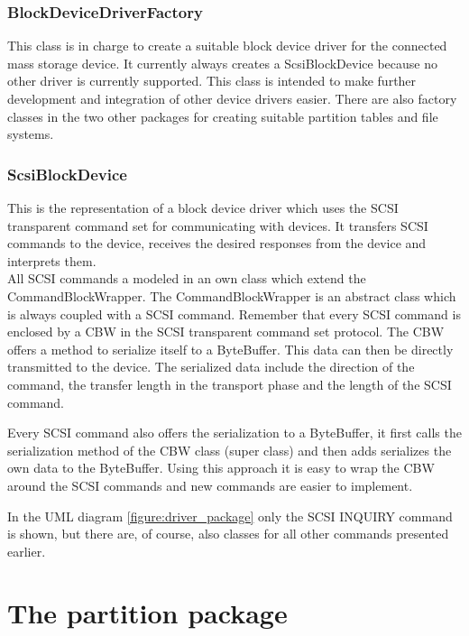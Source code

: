 \subsubsection{BlockDeviceDriverFactory}

This class is in charge to create a suitable block device driver for the connected mass storage device. It currently always creates a ScsiBlockDevice because no other driver is currently supported. This class is intended to make further development and integration of other device drivers easier. There are also factory classes in the two other packages for creating suitable partition tables and file systems.

\subsubsection{ScsiBlockDevice}

This is the representation of a block device driver which uses the SCSI transparent command set for communicating with devices. It transfers SCSI commands to the device, receives the desired responses from the device and interprets them.\\

All SCSI commands a modeled in an own class which extend the CommandBlockWrapper. The CommandBlockWrapper is an abstract class which is always coupled with a SCSI command. Remember that every SCSI command is enclosed by a CBW in the SCSI transparent command set protocol. The CBW offers a method to serialize itself to a ByteBuffer. This data can then be directly transmitted to the device. The serialized data include the direction of the command, the transfer length in the transport phase and the length of the SCSI command.

Every SCSI command also offers the serialization to a ByteBuffer, it first calls the serialization method of the CBW class (super class) and then adds serializes the own data to the ByteBuffer. Using this approach it is easy to wrap the CBW around the SCSI commands and new commands are easier to implement. 

In the UML diagram \ref{figure:driver_package} only the SCSI INQUIRY command is shown, but there are, of course, also classes for all other commands presented earlier.

\section{The partition package}

